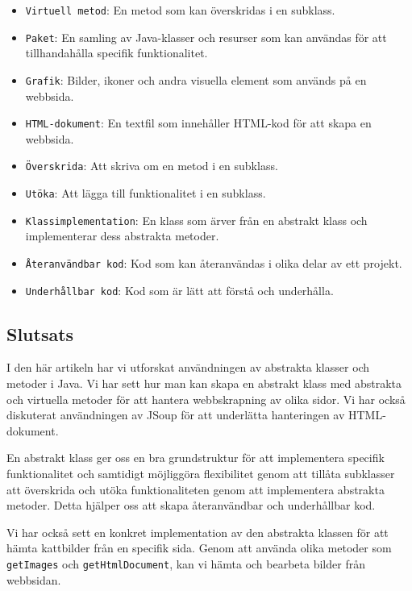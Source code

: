 \begin{itemize}
  \texttt{Abstrakt\ klass}: En klass som inte kan instansieras direkt
  utan måste ärvas och implementeras i en konkret klass.
\item
  \texttt{Virtuell\ metod}: En metod som kan överskridas i en subklass.
\item
  \texttt{Paket}: En samling av Java-klasser och resurser som kan
  användas för att tillhandahålla specifik funktionalitet.
\item
  \texttt{Grafik}: Bilder, ikoner och andra visuella element som används
  på en webbsida.
\item
  \texttt{HTML-dokument}: En textfil som innehåller HTML-kod för att
  skapa en webbsida.
\item
  \texttt{Överskrida}: Att skriva om en metod i en subklass.
\item
  \texttt{Utöka}: Att lägga till funktionalitet i en subklass.
\item
  \texttt{Klassimplementation}: En klass som ärver från en abstrakt
  klass och implementerar dess abstrakta metoder.
\item
  \texttt{Återanvändbar\ kod}: Kod som kan återanvändas i olika delar av
  ett projekt.
\item
  \texttt{Underhållbar\ kod}: Kod som är lätt att förstå och underhålla.
\end{itemize}

\hypertarget{slutsats}{%
\subsection{Slutsats}\label{slutsats}}

I den här artikeln har vi utforskat användningen av abstrakta klasser
och metoder i Java. Vi har sett hur man kan skapa en abstrakt klass med
abstrakta och virtuella metoder för att hantera webbskrapning av olika
sidor. Vi har också diskuterat användningen av JSoup för att underlätta
hanteringen av HTML-dokument.

En abstrakt klass ger oss en bra grundstruktur för att implementera
specifik funktionalitet och samtidigt möjliggöra flexibilitet genom att
tillåta subklasser att överskrida och utöka funktionaliteten genom att
implementera abstrakta metoder. Detta hjälper oss att skapa
återanvändbar och underhållbar kod.

Vi har också sett en konkret implementation av den abstrakta klassen för
att hämta kattbilder från en specifik sida. Genom att använda olika
metoder som \texttt{getImages} och \texttt{getHtmlDocument}, kan vi
hämta och bearbeta bilder från webbsidan.

